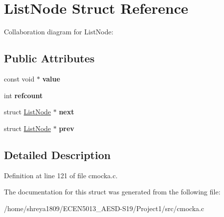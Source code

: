\hypertarget{structListNode}{}\section{List\+Node Struct Reference}
\label{structListNode}


Collaboration diagram for List\+Node\+:
\subsection*{Public Attributes}
\begin{DoxyCompactItemize}
\item 
\mbox{\label{structListNode_a048e935049ce14b34caab57c975a9ace}} 
const void $\ast$ {\bfseries value}
\item 
\mbox{\label{structListNode_a4b3cd4e8c0dab91f5a07978b50d63b38}} 
int {\bfseries refcount}
\item 
\mbox{\label{structListNode_ac7af9e18e0586f13d59a52b3501ac4ca}} 
struct \hyperlink{structListNode}{List\+Node} $\ast$ {\bfseries next}
\item 
\mbox{\label{structListNode_ac29aefb7627ded4e29dcb96b7a47f3f2}} 
struct \hyperlink{structListNode}{List\+Node} $\ast$ {\bfseries prev}
\end{DoxyCompactItemize}


\subsection{Detailed Description}


Definition at line 121 of file cmocka.\+c.



The documentation for this struct was generated from the following file\+:\begin{DoxyCompactItemize}
\item 
/home/shreya1809/\+E\+C\+E\+N5013\+\_\+\+A\+E\+S\+D-\/\+S19/\+Project1/src/cmocka.\+c\end{DoxyCompactItemize}
